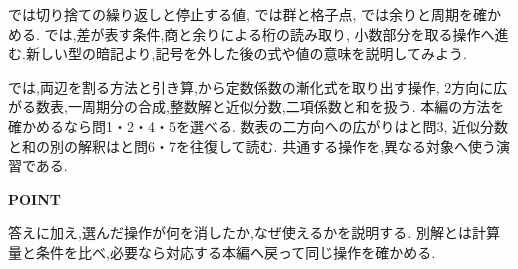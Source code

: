 では切り捨ての繰り返しと停止する値,
では群と格子点,
では余りと周期を確かめる.
では,差が表す条件,商と余りによる桁の読み取り,
小数部分を取る操作へ進む.新しい型の暗記より,記号を外した後の式や値の意味を説明してみよう.

では,両辺を割る方法と引き算,から定数係数の漸化式を取り出す操作,
2方向に広がる数表,一周期分の合成,整数解と近似分数,二項係数と和を扱う.
本編の方法を確かめるなら問1・2・4・5を選べる.
数表の二方向への広がりはと問3,
近似分数と和の別の解釈はと問6・7を往復して読む.
共通する操作を,異なる対象へ使う演習である.

\begin{bookpoint}
  \textbf{POINT}\par
  答えに加え,選んだ操作が何を消したか,なぜ使えるかを説明する.
  別解とは計算量と条件を比べ,必要なら対応する本編へ戻って同じ操作を確かめる.
\end{bookpoint}
